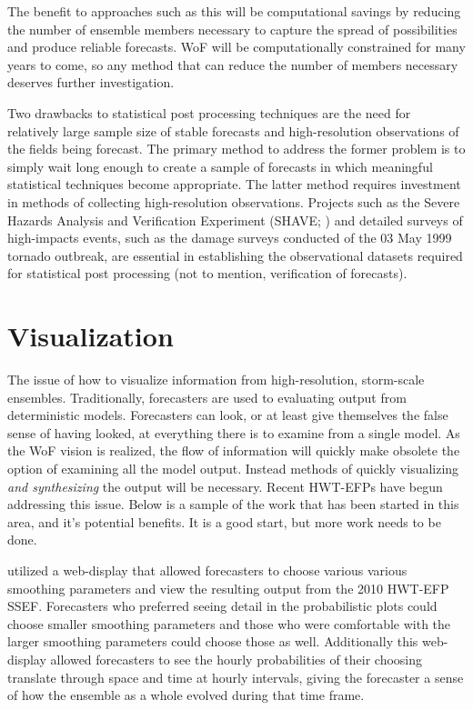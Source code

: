 The benefit to approaches such as this will be computational savings by reducing the number of ensemble members necessary to capture the spread of possibilities and produce reliable forecasts. WoF will be computationally constrained for many years to come, so any method that can reduce the number of members necessary deserves further investigation.


Two drawbacks to statistical post processing techniques are the need for relatively large sample size of stable forecasts and high-resolution observations of the fields being forecast. The primary method to address the former problem is to simply wait long enough to create a sample of forecasts in which meaningful statistical techniques become appropriate. The latter method requires investment in methods of collecting high-resolution observations. Projects such as the Severe Hazards Analysis and Verification Experiment (SHAVE; \citealp{ortega2009shave}) and detailed surveys of high-impacts events, such as the damage surveys conducted of the 03 May 1999 tornado outbreak, are essential in establishing the observational datasets required for statistical post processing (not to mention, verification of forecasts).




\section{Visualization}

The issue of how to visualize information from high-resolution, storm-scale ensembles. Traditionally, forecasters are used to evaluating output from deterministic models. Forecasters can look, or at least give themselves the false sense of having looked, at everything there is to examine from a single model. As the WoF vision is realized, the flow of information will quickly make obsolete the option of examining all the model output. Instead methods of quickly visualizing \emph{and synthesizing} the output will be necessary. Recent HWT-EFPs have begun addressing this issue. Below is a sample of the work that has been started in this area, and it's potential benefits. It is a good start, but more work needs to be done.


\cite{marsh2010sls} utilized a web-display that allowed forecasters to choose various various smoothing parameters and view the resulting output from the 2010 HWT-EFP SSEF. Forecasters who preferred seeing detail in the probabilistic plots could choose smaller smoothing parameters and those who were comfortable with the larger smoothing parameters could choose those as well.  Additionally this web-display allowed forecasters to see the hourly probabilities of their choosing translate through space and time at hourly intervals, giving the forecaster a sense of how the ensemble as a whole evolved during that time frame.


